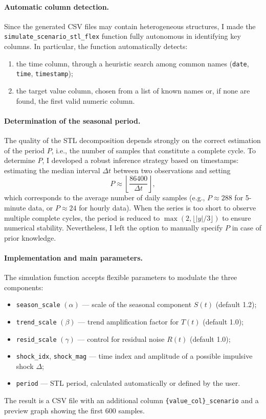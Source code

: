 \paragraph{Automatic column detection.}
Since the generated CSV files may contain heterogeneous structures, I made the \texttt{simulate\_scenario\_stl\_flex} function fully autonomous in identifying key columns.  
In particular, the function automatically detects:
\begin{enumerate}
  \item the time column, through a heuristic search among common names (\texttt{date}, \texttt{time}, \texttt{timestamp});
  \item the target value column, chosen from a list of known names or, if none are found, the first valid numeric column.
\end{enumerate}

\paragraph{Determination of the seasonal period.}
The quality of the STL decomposition depends strongly on the correct estimation of the period $P$, i.e., the number of samples that constitute a complete cycle.  
To determine $P$, I developed a robust inference strategy based on timestamps: estimating the median interval $\Delta t$ between two observations and setting
\[
P \approx \left\lfloor \frac{86400}{\Delta t} \right\rfloor,
\]
which corresponds to the average number of daily samples (e.g., $P \approx 288$ for 5-minute data, or $P \approx 24$ for hourly data).  
When the series is too short to observe multiple complete cycles, the period is reduced to $\max(2, \lfloor |y|/3 \rfloor)$ to ensure numerical stability.  
Nevertheless, I left the option to manually specify $P$ in case of prior knowledge.

\paragraph{Implementation and main parameters.}
The simulation function accepts flexible parameters to modulate the three components:
\begin{itemize}
  \item \texttt{season\_scale} $(\alpha)$ — scale of the seasonal component $S(t)$ (default 1.2);
  \item \texttt{trend\_scale} $(\beta)$ — trend amplification factor for $T(t)$ (default 1.0);
  \item \texttt{resid\_scale} $(\gamma)$ — control for residual noise $R(t)$ (default 1.0);
  \item \texttt{shock\_idx}, \texttt{shock\_mag} — time index and amplitude of a possible impulsive shock $\Delta$;
  \item \texttt{period} — STL period, calculated automatically or defined by the user.
\end{itemize}
The result is a CSV file with an additional column \texttt{\{value\_col\}\_scenario} and a preview graph showing the first 600 samples.

